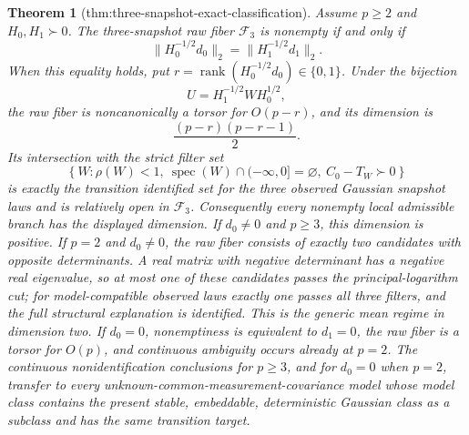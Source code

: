 \documentclass{article}
\newtheorem{theorem}{Theorem}
\begin{document}
\begin{theorem}[thm:three-snapshot-exact-classification]\label{thm:three-snapshot-exact-classification}
Assume \(p\ge 2\) and \(H_0,H_1\succ0\).  The three-snapshot raw fiber \(\mathcal F_3\) is nonempty if and only if
\[
 \lVert H_0^{-1/2}d_0\rVert_2=\lVert H_1^{-1/2}d_1\rVert_2.
\]
When this equality holds, put \(r=\operatorname{rank}(H_0^{-1/2}d_0)\in\{0,1\}\).  Under the bijection
\[
 U=H_1^{-1/2}WH_0^{1/2},
\]
the raw fiber is noncanonically a torsor for \(O(p-r)\), and its dimension is
\[
 \frac{(p-r)(p-r-1)}{2}.
\]
Its intersection with the strict filter set
\[
 \left\{W:\rho(W)<1,\ \operatorname{spec}(W)\cap(-\infty,0]=\varnothing,\ C_0-T_W\succ0\right\}
\]
is exactly the transition identified set for the three observed Gaussian snapshot laws and is relatively open in \(\mathcal F_3\).  Consequently every nonempty local admissible branch has the displayed dimension.  If \(d_0\ne0\) and \(p\ge3\), this dimension is positive.  If \(p=2\) and \(d_0\ne0\), the raw fiber consists of exactly two candidates with opposite determinants.  A real matrix with negative determinant has a negative real eigenvalue, so at most one of these candidates passes the principal-logarithm cut; for model-compatible observed laws exactly one passes all three filters, and the full structural explanation is identified.  This is the generic mean regime in dimension two.  If \(d_0=0\), nonemptiness is equivalent to \(d_1=0\), the raw fiber is a torsor for \(O(p)\), and continuous ambiguity occurs already at \(p=2\).  The continuous nonidentification conclusions for \(p\ge3\), and for \(d_0=0\) when \(p=2\), transfer to every unknown-common-measurement-covariance model whose model class contains the present stable, embeddable, deterministic Gaussian class as a subclass and has the same transition target.
\end{theorem}
\end{document}
